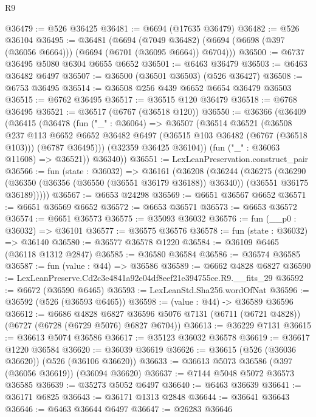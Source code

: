 \begin{lexlean}{R9}
\begin{coremodule}
@36479 := @526 @36425
@36481 := @6694 (@17635 @36479)
@36482 := @526 @36104
@36495 := @36481
    (@6694
      (@7049 @36482)
      (@6694 (@6698 (@397 (@36056 @6664))) (@6694 (@6701 (@36095 @6664)) @6704)))
@36500 := @6737 @36495 @5080 @6304 @6655 @6652
@36501 := @6463 @36479
@36503 := @6463 @36482 @6497
@36507 := @36500 (@36501 @36503) (@526 @36427)
@36508 := @6753 @36495
@36514 := @36508 @256 @439 @6652 @6654 @36479 @36503
@36515 := @6762 @36495
@36517 := @36515 @120 @36479
@36518 := @6768 @36495
@36521 := @36517 (@6767 (@36518 @120))
@36550 := @36366
    (@36409
      (@36415
        (@36478
          (fun ("_" : @36064) =>
          @36507
            (@36514
              @36521
              (@36508
                @237
                @113
                @6652
                @6652
                @36482
                @6497
                (@36515 @103 @36482 (@6767 (@36518 @103)))
                (@6787 @36495)))
            (@32359 @36425 @36104))
          (fun ("_" : @36063 @11608) => @36521))
        @36340))
@36551 := LexLeanPreservation.construct_pair
@36566 := fun (state : @36032) =>
  @36161
    (@36208
      (@36244
        (@36275
          (@36290
            (@36350 (@36356 (@36550 (@36551 @36179 @36188)) @36340))
            (@36551 @36175 @36189)))))
@36567 := @6653 @24298
@36569 := @6651 @36567 @6652
@36571 := @6651 @36569 @6652
@36572 := @6653 @36571
@36573 := @6653 @36572
@36574 := @6651 @36573
@36575 := @35093 @36032
@36576 := fun (__p0 : @36032) => @36101
@36577 := @36575 @36576
@36578 := fun (state : @36032) => @36140
@36580 := @36577 @36578 @1220
@36584 := @36109 @6465 (@36118 @1312 @2847)
@36585 := @36580 @36584
@36586 := @36574 @36585
@36587 := fun (value : @44) => @36586
@36589 := @6662 @4828 @6827
@36590 := LexLeanPreserve.Cd2c3e4841a92e04df8eef21e394755ce.R9.__fits_29
@36592 := @6672 (@36590 @6465)
@36593 := LexLeanStd.Sha256.wordOfNat
@36596 := @36592 (@526 (@36593 @6465))
@36598 := (value : @44) -> @36589 @36596
@36612 := @6686
    @4828
    @6827
    @36596
    @5076
    @7131
    (@6711 (@6721 @4828))
    (@6727 (@6728 (@6729 @5076) @6827 @6704))
@36613 := @36229 @7131
@36615 := @36613 @5074 @36586
@36617 := @35123 @36032 @36578
@36619 := @36617 @1220 @36584
@36620 := @36039 @36619
@36626 := @36615 (@526 (@36036 @36620)) (@526 (@36106 @36620))
@36633 := @36613 @5073 @36586 (@397 (@36056 @36619)) (@36094 @36620)
@36637 := @7144 @5048 @5072 @36573 @36585
@36639 := @35273 @5052 @6497
@36640 := @6463 @36639
@36641 := @36171 @6825
@36643 := @36171 @1313 @2848
@36644 := @36641 @36643
@36646 := @6463 @36644 @6497
@36647 := @26283 @36646

\end{coremodule}
\end{lexlean}
